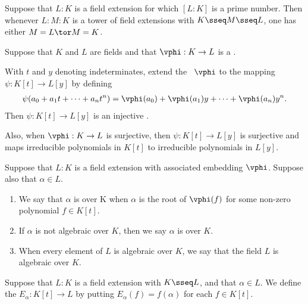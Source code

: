 \documentclass{article}
\begin{document}
  \begin{tcorollary}
    Suppose that \( L:K \) is a field extension for which \( [L: K] \) is a prime number.
    Then whenever \( L : M : K \) is a tower of field extensions with \( K \sseq M \sseq L \), one has either \( M= L \tor M= K \).
  \end{tcorollary}

  \begin{tproposition}
    Suppose that \( K \) and \( L \) are fields and that \( \vphi : K \to L \) is a \homo.

    With \( t \) and \( y \) denoting indeterminates, extend the \homo~\( \vphi \) to the mapping \( \psi: K[t] \to L[y] \) by defining \begin{align*}
      \psi(a_0 + a_1t+\cdots + a_n t^n) = \vphi(a_0) + \vphi(a_1)y+\cdots + \vphi(a_n)y^n.
    \end{align*}
    Then \( \psi:K[t]\to L[y] \) is an injective \homo.

    Also, when \( \vphi:K\to L \) is surjective, then \( \psi: K[t]\to L[y] \) is surjective and maps irreducible polynomials in \( K[t] \) to irreducible polynomials in \( L[y] \).
  \end{tproposition}

  \begin{tdefinition}
    Suppose that \( L: K \) is a field extension with associated embedding \( \vphi \).
    Suppose also that \( \alpha\in L \).
\begin{enumerate}[label=(\roman*)]
      \item We say that \( \alpha \) is  over K when \( \alpha \) is the root of \( \vphi(f) \) for some non-zero polynomial \( f \in K[t] \).
      \item If \( \alpha \) is not algebraic over \( K \), then we say \( \alpha \) is  over \( K \).
      \item When every element of \( L \) is algebraic over \( K \), we say that the field \( L \) is algebraic over \( K \).
    \end{enumerate}
  \end{tdefinition}

  \begin{tdefinition}
    Suppose that \( L: K \) is a field extension with \( K \sseq L \), and that \( \alpha\in L \).
    We define the  \( E_\alpha : K[t] \to L \) by putting \( E_\alpha(f) = f(\alpha) \) for each \( f \in K[t] \).
  \end{tdefinition}
\end{document}

